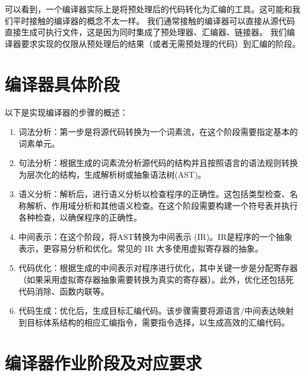可以看到，一个编译器实际上是将预处理后的代码转化为汇编的工具。这可能和我们平时接触的编译器的概念不太一样。
我们通常接触的编译器可以直接从源代码直接生成可执行文件，这是因为同时集成了预处理器、汇编器、链接器。
我们编译器要求实现的仅限从预处理后的结果（或者无需预处理的代码）到汇编的阶段。

\section{编译器具体阶段}

以下是实现编译器的步骤的概述：

\begin{enumerate}
    \item 词法分析：第一步是将源代码转换为一个词素流，在这个阶段需要指定基本的词素单元。
    \item 句法分析：根据生成的词素流分析源代码的结构并且按照语言的语法规则转换为层次化的结构，生成解析树或抽象语法树(AST)。
    \item 语义分析：解析后，进行语义分析以检查程序的正确性。这包括类型检查、名称解析、作用域分析和其他语义检查。在这个阶段需要构建一个符号表并执行各种检查，以确保程序的正确性。
    \item 中间表示：在这个阶段，将AST转换为中间表示 (IR)。IR是程序的一个抽象表示，更容易分析和优化。常见的 IR 大多使用虚拟寄存器的抽象。
    \item 代码优化：根据生成的中间表示对程序进行优化，其中关键一步是分配寄存器（如果采用虚拟寄存器抽象需要转换为真实的寄存器）。此外，优化还包括死代码消除、函数内联等。
    \item 代码生成：优化后，生成目标汇编代码。该步骤需要将源语言/中间表达映射到目标体系结构的相应汇编指令，需要指令选择，以生成高效的汇编代码。
\end{enumerate}

\section{编译器作业阶段及对应要求}

